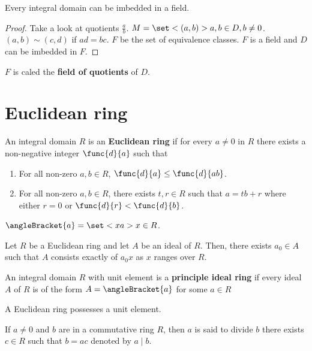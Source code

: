 \begin{theorem}
    Every integral domain can be imbedded in a field.
\end{theorem}
\begin{proof}
    Take a look at quotients \(\frac{a}{b}\). \(M = \set<(a,b)>{a,b\in D, b \neq 0}\). \((a,b) \sim (c,d)\) if \(ad = bc\). \(F\) be the set of equivalence classes. \(F\) is a field and \(D\) can be imbedded in \(F\).
\end{proof}
\(F\) is caled the \textbf{field of quotients} of \(D\).

\section{Euclidean ring}
\begin{definition}
    An integral domain \(R\) is an \textbf{Euclidean ring} if for every \(a \neq 0\) in \(R\) there exists a non-negative integer \(\func{d}{a}\) such that 
    \begin{enumerate}
        \item For all non-zero \(a,b \in R\), \(\func{d}{a} \leq \func{d}{ab}\).
        \item For all non-zero \(a,b \in R\), there exists \(t,r \in R\) such that \(a = tb + r\) where either \(r = 0\) or \(\func{d}{r} < \func{d}{b}\).
    \end{enumerate}
\end{definition}

\(\angleBracket{a} = \set<xa>{x \in R}\).

\begin{theorem}
    Let \(R\) be a Euclidean ring and let \(A\) be an ideal of \(R\). Then, there exists \(a_0\in A\) such that \(A\) consists exactly of \(a_0 x\) as \(x\) ranges over \(R\).
\end{theorem}

\begin{definition}
    An integral domain \(R\) with unit element is a \textbf{principle ideal ring} if every ideal \(A\) of \(R\) is of the form \(A = \angleBracket{a}\) for some \(a \in R\)
\end{definition}

\begin{corollary}
    A Euclidean ring possesses a unit element.
\end{corollary}

\begin{definition}
    If \(a \neq 0\) and \(b\) are in a commutative ring \(R\), then \(a\) is said to divide \(b\) there exists \(c \in R\) such that  \(b = ac\) denoted by \(a \mid b\).
\end{definition}

